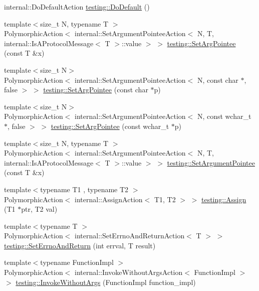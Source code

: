 \begin{DoxyCompactItemize}
\item 
internal\+::\+Do\+Default\+Action \mbox{\hyperlink{namespacetesting_ae041df61ff61ccb9753ba15b4309e1a6}{testing\+::\+Do\+Default}} ()
\item 
{\footnotesize template$<$size\+\_\+t N, typename T $>$ }\\Polymorphic\+Action$<$ internal\+::\+Set\+Argument\+Pointee\+Action$<$ N, T, internal\+::\+Is\+A\+Protocol\+Message$<$ T $>$\+::value $>$ $>$ \mbox{\hyperlink{namespacetesting_a5740a5033b88c37666fcd09a269d123f}{testing\+::\+Set\+Arg\+Pointee}} (const T \&x)
\item 
{\footnotesize template$<$size\+\_\+t N$>$ }\\Polymorphic\+Action$<$ internal\+::\+Set\+Argument\+Pointee\+Action$<$ N, const char $\ast$, false $>$ $>$ \mbox{\hyperlink{namespacetesting_a4a190fd2d02fb7cd79c5b3df3f80b647}{testing\+::\+Set\+Arg\+Pointee}} (const char $\ast$p)
\item 
{\footnotesize template$<$size\+\_\+t N$>$ }\\Polymorphic\+Action$<$ internal\+::\+Set\+Argument\+Pointee\+Action$<$ N, const wchar\+\_\+t $\ast$, false $>$ $>$ \mbox{\hyperlink{namespacetesting_ac128085b4a8d64563fd5ccef324ea177}{testing\+::\+Set\+Arg\+Pointee}} (const wchar\+\_\+t $\ast$p)
\item 
{\footnotesize template$<$size\+\_\+t N, typename T $>$ }\\Polymorphic\+Action$<$ internal\+::\+Set\+Argument\+Pointee\+Action$<$ N, T, internal\+::\+Is\+A\+Protocol\+Message$<$ T $>$\+::value $>$ $>$ \mbox{\hyperlink{namespacetesting_a03b315d27c91a8e719f2b6c09964130b}{testing\+::\+Set\+Argument\+Pointee}} (const T \&x)
\item 
{\footnotesize template$<$typename T1 , typename T2 $>$ }\\Polymorphic\+Action$<$ internal\+::\+Assign\+Action$<$ T1, T2 $>$ $>$ \mbox{\hyperlink{namespacetesting_abfc4121b8708e8b22a096ff8be88a9d0}{testing\+::\+Assign}} (T1 $\ast$ptr, T2 val)
\item 
{\footnotesize template$<$typename T $>$ }\\Polymorphic\+Action$<$ internal\+::\+Set\+Errno\+And\+Return\+Action$<$ T $>$ $>$ \mbox{\hyperlink{namespacetesting_a31095e421f167fade2e6d4d60df1f4da}{testing\+::\+Set\+Errno\+And\+Return}} (int errval, T result)
\item 
{\footnotesize template$<$typename Function\+Impl $>$ }\\Polymorphic\+Action$<$ internal\+::\+Invoke\+Without\+Args\+Action$<$ Function\+Impl $>$ $>$ \mbox{\hyperlink{namespacetesting_a88cc1999296bc630f6a49cdf66bb21f9}{testing\+::\+Invoke\+Without\+Args}} (Function\+Impl function\+\_\+impl)

\end{DoxyCompactItemize}

